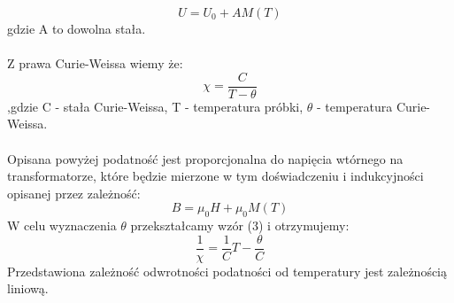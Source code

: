 \documentclass[a4paper,10pt]{article}
\begin{document}
\begin{equation}
U = U_0 + AM(T)
\end{equation}
gdzie A to dowolna stała.
\\
\\Z prawa Curie-Weissa wiemy że:
\begin{equation}
\chi = \frac{C}{T - \theta}
\end{equation}
,gdzie C - stała Curie-Weissa, T - temperatura próbki, $\theta$ - temperatura Curie-Weissa.
\\
\\Opisana powyżej podatność jest proporcjonalna do napięcia wtórnego na transformatorze, które będzie mierzone w tym doświadczeniu i indukcyjności opisanej przez zależność:
\begin{equation}
B = \mu_0 H + \mu_0 M(T)
\end{equation}
W celu wyznaczenia $\theta$ przekształcamy wzór (3) i otrzymujemy:
\begin{equation}
\frac{1}{\chi} = \frac{1}{C} T - \frac{\theta}{C}
\end{equation}
Przedstawiona zależność odwrotności podatności od temperatury jest zależnością liniową.
\end{document}
